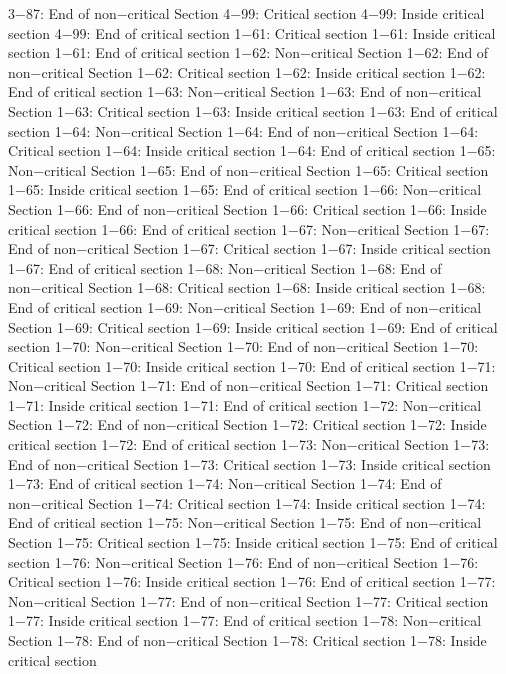 3−87: End of non−critical Section
4−99: Critical section
4−99: Inside critical section
4−99: End of critical section
1−61: Critical section
1−61: Inside critical section
1−61: End of critical section
1−62: Non−critical Section
1−62: End of non−critical Section
1−62: Critical section
1−62: Inside critical section
1−62: End of critical section
1−63: Non−critical Section
1−63: End of non−critical Section
1−63: Critical section
1−63: Inside critical section
1−63: End of critical section
1−64: Non−critical Section
1−64: End of non−critical Section
1−64: Critical section
1−64: Inside critical section
1−64: End of critical section
1−65: Non−critical Section
1−65: End of non−critical Section
1−65: Critical section
1−65: Inside critical section
1−65: End of critical section
1−66: Non−critical Section
1−66: End of non−critical Section
1−66: Critical section
1−66: Inside critical section
1−66: End of critical section
1−67: Non−critical Section
1−67: End of non−critical Section
1−67: Critical section
1−67: Inside critical section
1−67: End of critical section
1−68: Non−critical Section
1−68: End of non−critical Section
1−68: Critical section
1−68: Inside critical section
1−68: End of critical section
1−69: Non−critical Section
1−69: End of non−critical Section
1−69: Critical section
1−69: Inside critical section
1−69: End of critical section
1−70: Non−critical Section
1−70: End of non−critical Section
1−70: Critical section
1−70: Inside critical section
1−70: End of critical section
1−71: Non−critical Section
1−71: End of non−critical Section
1−71: Critical section
1−71: Inside critical section
1−71: End of critical section
1−72: Non−critical Section
1−72: End of non−critical Section
1−72: Critical section
1−72: Inside critical section
1−72: End of critical section
1−73: Non−critical Section
1−73: End of non−critical Section
1−73: Critical section
1−73: Inside critical section
1−73: End of critical section
1−74: Non−critical Section
1−74: End of non−critical Section
1−74: Critical section
1−74: Inside critical section
1−74: End of critical section
1−75: Non−critical Section
1−75: End of non−critical Section
1−75: Critical section
1−75: Inside critical section
1−75: End of critical section
1−76: Non−critical Section
1−76: End of non−critical Section
1−76: Critical section
1−76: Inside critical section
1−76: End of critical section
1−77: Non−critical Section
1−77: End of non−critical Section
1−77: Critical section
1−77: Inside critical section
1−77: End of critical section
1−78: Non−critical Section
1−78: End of non−critical Section
1−78: Critical section
1−78: Inside critical section
